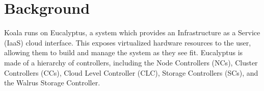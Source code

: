 \section{Background}

Koala runs on Eucalyptus, a system which provides an Infrastructure as a Service (IaaS) cloud interface.  This exposes virtualized hardware resources to the user, allowing them to build and manage the system as they see fit.  Eucalyptus is made of a hierarchy of controllers, including the Node Controllers (NCs), Cluster Controllers (CCs), Cloud Level Controller (CLC), Storage Controllers (SCs), and the Walrus Storage Controller.


